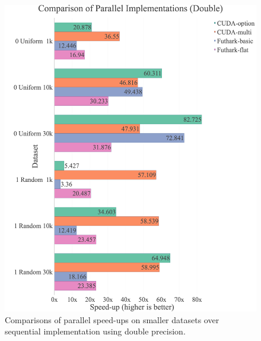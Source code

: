 \begin{figure}[H]
	\centering
	\caption{Comparisons of parallel speed-ups on smaller datasets over sequential implementation using double precision.}
    \label{fig:results:speedup-double-small}
    \includegraphics[width=1\textwidth]{img/experiments/small-text-approaches-double.png}
\end{figure}

